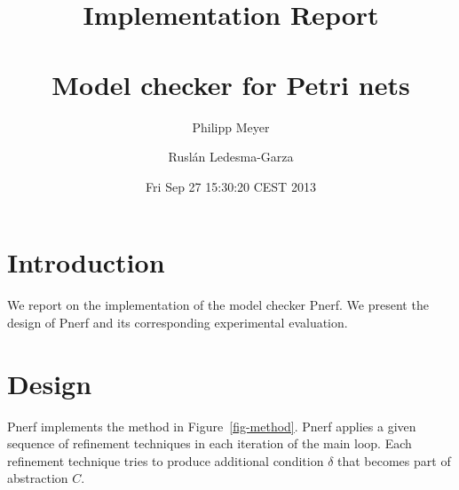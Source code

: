 \documentclass{article}
\begin{document}
\title{Implementation Report \\ \mbox{ } \\ Model checker for Petri nets}
\author{Philipp Meyer \and Rusl\'{a}n Ledesma-Garza}
\date{Fri Sep 27 15:30:20 CEST 2013}

\maketitle

\tableofcontents

\iffalse
\begin{verbatim}
- Introduction
  - Diagram of method
- Refinement techniques
  - Trap conditions
  - Subnet trap conditions
  - Empty trap conditions
- State space exploration
- Experiments
  - Trap conditions
    - diagram
    - example: Peterson's
  - Trap and subnet trap conditions
    - diagram
    - example: cyclic net
  - Trap, subnet trap, and empty trap conditions
    - diagram placeholder
    - example: Empty trap condition net
  - State space exploration & trap conditions
- Benchmarks
  - No refinement technique
  - Trap conditions
  - Trap and subnet trap conditions
  - Trap, subnet trap, and empty trap conditions
  - State space exploration and trap conditions
\end{verbatim}
\fi

\section{Introduction}

We report on the implementation of the model checker Pnerf. We
present the design of Pnerf and its corresponding experimental
evaluation.

\section{Design}

Pnerf implements the method in Figure~\ref{fig-method}. Pnerf applies
a given sequence of refinement techniques in each iteration of the
main loop. Each refinement technique tries to produce additional condition
$\delta$ that becomes part of abstraction $C$.
\end{document}
